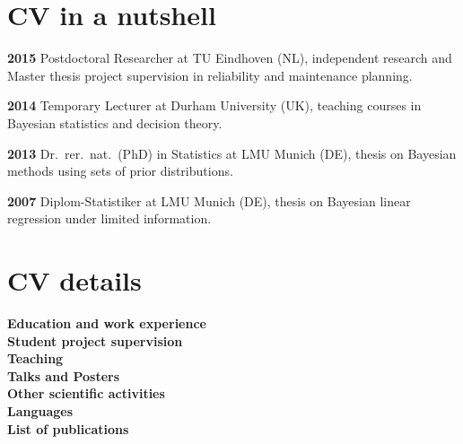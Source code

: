 \documentclass[a4paper]{simplecv}
\begin{document}
\section{CV in a nutshell}
\begin{topic}
\item[\bfseries 2015] Postdoctoral Researcher at TU Eindhoven (NL),
independent research and Master thesis project supervision in reliability and maintenance planning.
\item[\bfseries 2014] Temporary Lecturer at Durham University (UK),
teaching courses in Bayesian statistics and decision theory.
\item[\bfseries 2013] Dr.\ rer.\ nat.\ (PhD) in Statistics at LMU Munich (DE),
thesis on Bayesian methods using sets of prior distributions.
\item[\bfseries 2007] Diplom-Statistiker at LMU Munich (DE),
thesis on Bayesian linear regression under limited information.
\end{topic}


\section{CV details}
\textbf{\sf Education and work experience} \dotfill \pageref{education}\\
\textbf{\sf Student project supervision} \dotfill \pageref{supervision}\\
\textbf{\sf Teaching} \dotfill \pageref{teaching}\\
\textbf{\sf Talks and Posters} \dotfill \pageref{talks}\\
\textbf{\sf Other scientific activities} \dotfill \pageref{other}\\
\textbf{\sf Languages} \dotfill \pageref{languages}\\
\textbf{\sf List of publications} \dotfill \pageref{publications}\\


\end{document}
